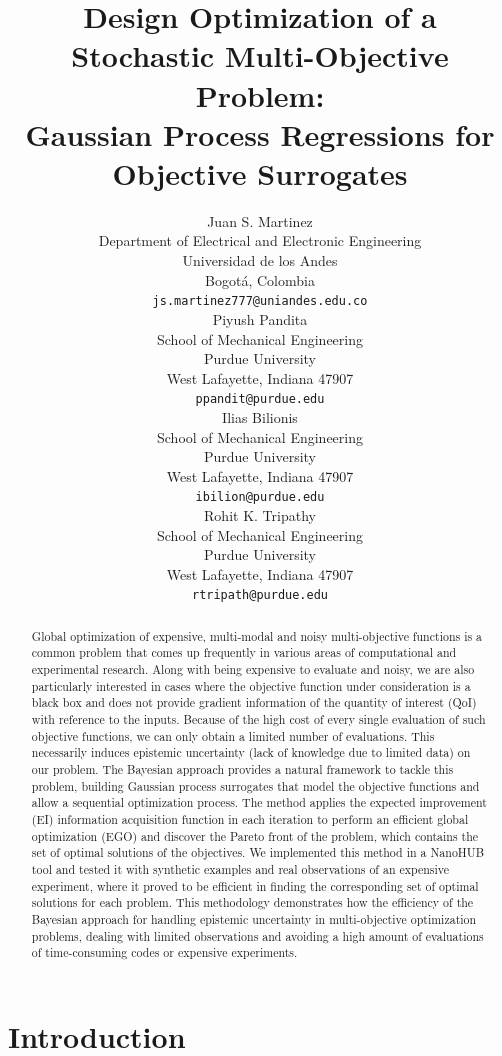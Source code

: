 \documentclass{article}
\title{Design Optimization of a Stochastic Multi-Objective Problem: \\Gaussian Process Regressions for Objective Surrogates}
\author{
  Juan S. Martinez\\
  Department of Electrical and Electronic Engineering\\
  Universidad de los Andes\\
  Bogotá, Colombia \\
  \texttt{js.martinez777@uniandes.edu.co} \\
  \And
  Piyush Pandita \\
  School of Mechanical Engineering \\
  Purdue University \\
  West Lafayette, Indiana 47907\\
  \texttt{ppandit@purdue.edu} \\
  \AND
  Ilias Bilionis \\
  School of Mechanical Engineering \\
  Purdue University \\
  West Lafayette, Indiana 47907\\
  \texttt{ibilion@purdue.edu} \\
  \And
  Rohit K. Tripathy \\
  School of Mechanical Engineering \\
  Purdue University \\
  West Lafayette, Indiana 47907\\
  \texttt{rtripath@purdue.edu} \\
}
\begin{document}

\maketitle

\begin{abstract}
    Global optimization of expensive, multi-modal and noisy multi-objective functions is a common problem that comes up frequently in various areas of computational and experimental research. Along with being expensive to evaluate and noisy, we are also particularly interested in cases where the objective function under consideration is a black box and does not provide gradient information of the quantity of interest (QoI) with reference to the inputs. Because of the high cost of every single evaluation of such objective functions, we can only obtain a limited number of evaluations. This necessarily induces epistemic uncertainty (lack of knowledge due to limited data) on our problem. The Bayesian approach provides a natural framework to tackle this problem, building Gaussian process surrogates that model the objective functions and allow a sequential optimization process. The method applies the expected improvement (EI) information acquisition function in each iteration to perform an efficient global optimization (EGO) and discover the Pareto front of the problem, which contains the set of optimal solutions of the objectives. We implemented this method in a NanoHUB tool and tested it with synthetic examples and real observations of an expensive experiment, where it proved to be efficient in finding the corresponding set of optimal solutions for each problem. This methodology demonstrates how the efficiency of the Bayesian approach for handling epistemic uncertainty in multi-objective optimization problems, dealing with limited observations and avoiding a high amount of evaluations of time-consuming codes or expensive experiments.
\end{abstract}

\section{Introduction}
\end{document}
